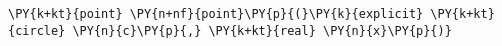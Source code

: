 \begin{Verbatim}[commandchars=\\\{\}]
    \PY{k+kt}{point} \PY{n+nf}{point}\PY{p}{(}\PY{k}{explicit} \PY{k+kt}{circle} \PY{n}{c}\PY{p}{,} \PY{k+kt}{real} \PY{n}{x}\PY{p}{)}
\end{Verbatim}
